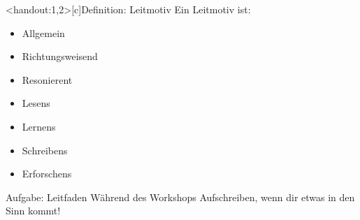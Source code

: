 \begin{frame}<handout:1,2>[c]{Definition: Leitmotiv}
    \vspace{0.5cm}
    \large{
    Ein Leitmotiv ist:}
    \begin{itemize}[<+(1)->]
        \large
        \item Allgemein
        \item Richtungsweisend
        \item Resonierent
    \end{itemize}
    \pause
    \vspace{0.4cm}
    {  }
    \begin{multicols}{2}
    \begin{itemize}[<+(1)->]
        \item Lesens
        \item Lernens
        \item Schreibens
        \item Erforschens
    \end{itemize}
    \end{multicols}
\end{frame}



\begin{frame}[c]{Aufgabe: Leitfaden}
    \Large
    Während des Workshops Aufschreiben, wenn dir etwas in den Sinn kommt!
\end{frame}


%



